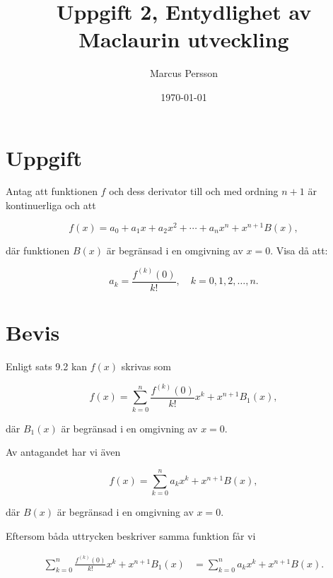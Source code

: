 \documentclass{article}
\title{Uppgift 2, Entydlighet av Maclaurin utveckling}
\author{Marcus Persson}
\date{\today}
\begin{document}
\maketitle

\section*{Uppgift}

Antag att funktionen $f$ och dess derivator
till och med ordning $n+1$ är kontinuerliga och att

\begin{equation}
\label{Maclaurin_utveckling}
    f(x) = a_0 + a_1x + a_2x^2
    + \cdots + a_nx^n + x^{n+1}B(x),
\end{equation}

\noindent där funktionen $B(x)$ är begränsad i en omgivning av $x=0$.
Visa då att:

\begin{equation}
\label{*}
    a_k = \frac{f^{(k)}(0)}{k!},
    \quad k = 0,1,2,\ldots,n.
\end{equation}


\section*{Bevis}

\noindent Enligt sats 9.2 kan $f(x)$ skrivas som

\begin{equation}
    f(x) =
    \sum_{k=0}^{n}
    \frac{f^{(k)}(0)}{k!}x^k
    + x^{n+1}B_1(x),
\end{equation}

\noindent där $B_1(x)$ är begränsad i en omgivning av $x=0$.

\noindent Av antagandet har vi även

\begin{equation}
    f(x) =
    \sum_{k=0}^{n} a_kx^k
    + x^{n+1}B(x),
\end{equation}

\noindent där $B(x)$ är begränsad i en omgivning av $x=0$.

\noindent Eftersom båda uttrycken beskriver samma funktion får vi

\begin{equation}
\begin{aligned}
    \sum_{k=0}^{n}
    \frac{f^{(k)}(0)}{k!}x^k
    + x^{n+1}B_1(x)
    &=
    \sum_{k=0}^{n} a_kx^k
    + x^{n+1}B(x).
\end{aligned}
\end{equation}
\end{document}

